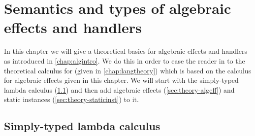 {
\newcommand\synchange[1]{\colorbox{lightgray}{$#1$}}

\newcommand\eff[0]{\epsilon}
\newcommand\Eff[0]{E}
\newcommand\Op[1]{O^{#1}}

\newcommand\ty[0]{\tau}
\newcommand\tunit[0]{()}
\newcommand\tarr[2]{#1 \rightarrow #2}
\newcommand\thandler[2]{#1 \Rightarrow #2}
\newcommand\tforall[3]{\forall(#1:#2) . #3}
\newcommand\tinst[1]{\mathsf{inst}(#1)}

\newcommand\cty[0]{\underline{\ty}}
\newcommand\aty[2]{#1 \; ! \; #2}
\newcommand\texists[3]{\exists(#1:#2) . #3}
\newcommand\texistss[2]{\exists \overrightarrow{#1} . #2}
\newcommand\val[0]{\nu}
\newcommand\vunit[0]{()}
\newcommand\vinst[0]{\iota}
\newcommand\vabst[3]{\Lambda(#1:#2) . #3}
\newcommand\vabs[2]{\lambda #1 . #2}
\newcommand\vappt[2]{#1 \; [ #2 ]}

\newcommand\comp[0]{c}
\newcommand\creturn[1]{\mathsf{return} \; #1}
\newcommand\capp[2]{#1 \; #2}
\newcommand\cdo[3]{#1 \leftarrow #2 ; #3}
\newcommand\cop[2]{#1(#2)}
\newcommand\copi[3]{#1 \# #2(#3)}
\newcommand\chandle[2]{\mathsf{handle} (#1) \{ #2 \}}
\newcommand\chandlei[3]{\mathsf{handle}^{#1} (#2) \{ #3 \}}
\newcommand\cnew[1]{\mathsf{new} \; #1}
\newcommand\cunpack[4]{(#1, #2) \leftarrow #3 ; #4}

\newcommand\hop[5]{#1 \; #2 \; #3 \rightarrow #4 ; \; #5}
\newcommand\hreturn[2]{\mathsf{return}\; #1 \rightarrow #2}
\newcommand\hopc[4]{#1 \; #2 \; #3 \rightarrow #4}

\chapter{\label{chap:algtheory}Semantics and types of algebraic effects and handlers}

In this chapter we will give a theoretical basics for algebraic effects and handlers as introduced in \cref{chap:algintro}.
We do this in order to ease the reader in to the theoretical calculus for \lang{} (given in \cref{chap:langtheory}) which is based on the calculus for algebraic effects given in this chapter.
We will start with the simply-typed lambda calculus (\cref{sec:theory-stlc}) and then add algebraic effects (\cref{sec:theory-algeff}) and static instances (\cref{sec:theory-staticinst}) to it.

\section{Simply-typed lambda calculus} \label{sec:theory-stlc}

}
